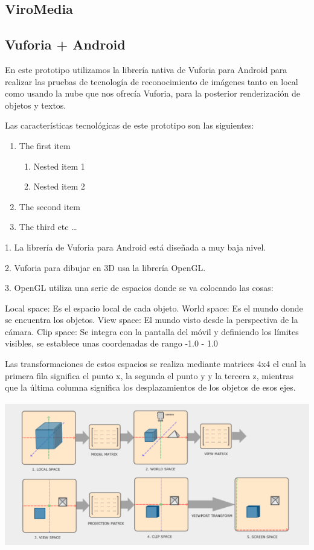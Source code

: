 \subsection{ViroMedia} 
\label{makereference3.6.2} 
 
\subsection{Vuforia + Android} 
\label{makereference3.6.3} 
 
En este prototipo utilizamos la librería nativa de Vuforia para Android para 
realizar las pruebas de tecnología de reconocimiento de imágenes tanto en  
local como usando la nube que nos ofrecía Vuforia, para la posterior renderización
de objetos y textos.

Las características tecnológicas de este prototipo son las siguientes:
\begin{enumerate}
    \item The first item
    \begin{enumerate}
    \item Nested item 1
    \item Nested item 2
    \end{enumerate}
    \item The second item
    \item The third etc \ldots
    \end{enumerate}
1. La librería de Vuforia para Android está diseñada a muy baja nivel. 

2. Vuforia para dibujar en 3D usa la librería OpenGL.

3. OpenGL utiliza una serie de espacios donde se va colocando las cosas:

Local space: Es el espacio local de cada objeto.
World space: Es el mundo donde se encuentra los objetos.
View space: El mundo visto desde la perspectiva de la cámara.
Clip space: Se integra con la pantalla del móvil y definiendo los límites 
visibles, se establece unas coordenadas de rango -1.0 - 1.0

Las transformaciones de estos espacios se realiza mediante matrices 4x4 
el cual la primera fila significa el punto x, la segunda el punto y y la 
tercera z, mientras que la última columna significa los desplazamientos 
de los objetos de esos ejes.

\includegraphics[height=2.5in]{figures/space-transformation.png}

